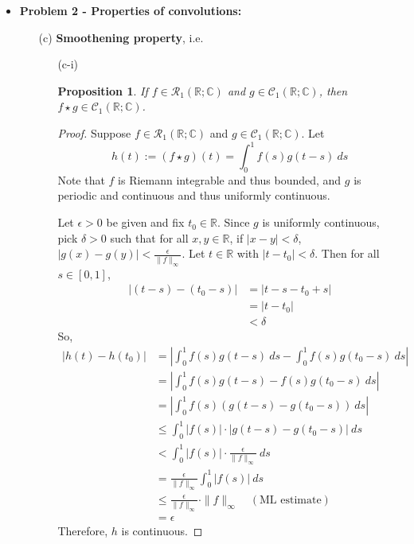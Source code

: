 \documentclass[12pt, reqno]{amsart}
\newtheorem{prop}{Proposition}[section]
\theoremstyle{definition}
\theoremstyle{remark}
\begin{document}
\begin{itemize}
\begin{proof}
\end{proof}

\vspace{0.2 cm}
\item {\bf{Problem 2 - Properties of convolutions:}} 


\vspace{0.1 cm}
\begin{itemize}

\vspace{0.1 cm}
\item[(c)] {\bf{Smoothening property}}, i.e. 
   \begin{itemize}
      \item[(c-i)] 
      
      \begin{prop}
         
      If $f \in \mathcal{R}_1(\mathbb{R}; \mathbb{C})$ and $g \in \mathcal{C}_1(\mathbb{R}; \mathbb{C})$, then $f \star g \in \mathcal{C}_1(\mathbb{R}; \mathbb{C})$.
      \end{prop}
      

\begin{proof}
   Suppose $f\in \mathcal{R}_{1}(\mathbb{R};\mathbb{C})$ and $g\in \mathcal{C}_{1}(\mathbb{R};\mathbb{C})$. Let $$h(t):=(f\star g)(t)=\int_{0}^{1}f(s)g(t-s)\ ds$$
Note that $f$ is Riemann integrable and thus bounded, and $g$ is periodic and continuous and thus uniformly continuous.

Let $\epsilon>0$ be given and fix $t_{0}\in \mathbb{R}$. Since $g$ is uniformly continuous, pick $\delta>0$ such that for all $x,y\in \mathbb{R}$, if $|x-y|<\delta$, $|g(x)-g(y)|< \frac{\epsilon}{\|f\|_{\infty}}$. Let $t\in \mathbb{R}$ with $|t-t_{0}|<\delta$. Then for all $s\in[0,1]$, \begin{align*}|(t-s)-(t_{0}-s)|&=|t-s-t_{0}+s|\\&=|t-t_{0}|\\&<\delta\end{align*}So, 
\begin{align*}
|h(t)-h(t_{0})|&= \left|\int_{0}^{1}f(s)g(t-s)\ ds-\int_{0}^{1}f(s)g(t_{0}-s)\ ds\right|\\
&= \left|\int_{0}^{1}f(s)g(t-s)- f(s)g(t_{0}-s)\ ds\right|\\
&= \left|\int_{0}^{1}f(s)(g(t-s)- g(t_{0}-s))\ ds\right|\\
&\le \int_{0}^{1}\left|f(s)\right|\cdot\left|g(t-s)-g(t_{0}-s)\right|\ ds\\
&< \int_{0}^{1}|f(s)|\cdot \frac{\epsilon}{\|f\|_{\infty}}\ ds\\
	&= \frac{\epsilon}{\|f\|_{\infty}}\int_{0}^{1}\left|f(s)\right|\ ds\\
&\le \frac{\epsilon}{\|f\|_{\infty}}\cdot\|f\|_{\infty}\quad(\text{ML estimate})\\
&= \epsilon
\end{align*}
Therefore, $h$ is continuous.


\end{proof}
\end{itemize}
\end{itemize}
\end{itemize}
\end{document}
